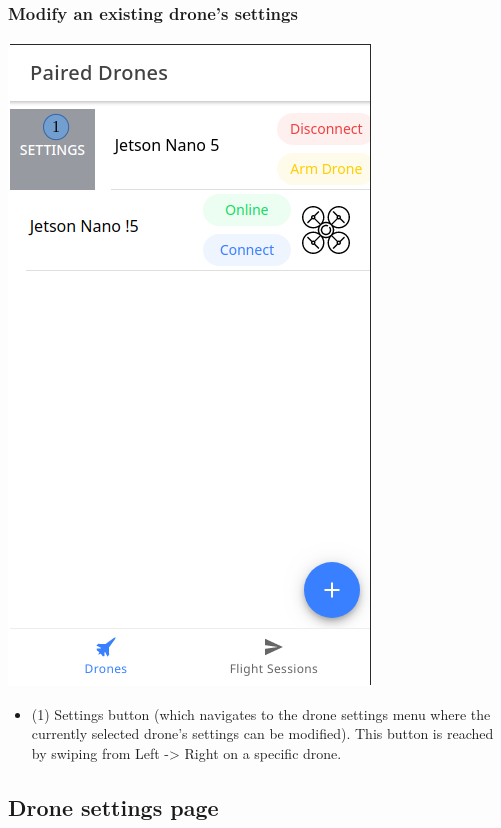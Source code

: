\subsubsection{Modify an existing drone's settings}
\begin{minipage}[c]{0.5\linewidth}
	\centering
	\includegraphics[scale=0.4]{./assets/images/settings.png}
	\label{fig: mainPageDroneSettings}
\end{minipage}
\begin{minipage}[c]{0.5\linewidth}
	\begin{itemize}
		\item (1) Settings button (which navigates to the drone settings menu where the currently selected drone's settings can be modified). This button is reached by swiping from Left -> Right on a specific drone.
	\end{itemize}
\end{minipage}

\subsection{Drone settings page}
